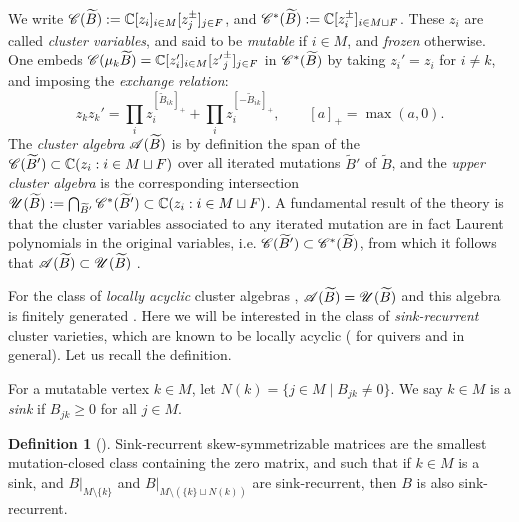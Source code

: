 \documentclass[12pt, letter]{amsart}
\theoremstyle{definition}
\newtheorem{definition}[dummy]{Definition}
\begin{document}
We write $\mathscr{C}(\widetilde B) := \mathbb{C}[z_i]_{i\in M} [z_j^{\pm}]_{j \in F}$, and $\mathscr{C}^*(\widetilde B) := \mathbb{C}[z_i^{\pm}]_{i\in M \sqcup F}$.  These $z_i$ are called {\em cluster variables}, and said to be {\em mutable} if $i\in M$, and {\em frozen} otherwise. 
One embeds $\mathscr{C}(\mu_k \widetilde B) = \mathbb{C}[z'_i]_{i\in M} [{z'}_j^{\pm}]_{j \in F}$ in  $\mathscr{C}^*(\widetilde B)$ by taking $z_i' = z_i$ for $i \ne k$, and imposing the {\em exchange relation}: 
\begin{equation}\label{eq:exchange}
 z_kz_k'=\prod_i z_i^{[\widetilde B_{ik}]_+}
              +\prod_i z_i^{[-\widetilde B_{ik}]_+},
 \qquad [a]_+=\max(a,0).
\end{equation}
The {\em cluster algebra}  $\mathscr{A}(\widetilde B)$ is by definition the span of the $\mathscr{C}(\widetilde B') \subset \mathbb{C}(z_i:i\in M\sqcup F)$ over all iterated mutations $\widetilde B'$ of $\widetilde B$, and the {\em upper cluster algebra} is the corresponding intersection 
$\mathscr{U}(\widetilde B) := \bigcap_{\widetilde B'} \mathscr{C}^*(\widetilde B') \subset \mathbb{C}(z_i:i\in M\sqcup F)$. 
A fundamental result of the theory is that  the cluster variables associated to any iterated mutation are in fact Laurent polynomials in the original variables, i.e.
$\mathscr{C}(\widetilde B') \subset \mathscr{C}^*(\widetilde B)$, from which it follows that $\mathscr{A}(\widetilde B) \subset \mathscr{U}(\widetilde B)$ \cite{FZ-I}.

For the class of {\em locally acyclic} cluster algebras \cite{M}, $\mathscr{A}(\widetilde B) = \mathscr{U}(\widetilde B)$ and this algebra is finitely generated \cite[Theorem~4.1 and 4.2]{M}.  Here we will be interested in the  class of {\em sink-recurrent} cluster varieties, which are known to be locally acyclic 
(\cite[Proposition~5.5]{GLSS} for quivers and  \cite[Proposition~3.7]{GLSB} in general).  Let us recall the definition. 


For a mutatable vertex \(k\in M\), let \(N(k) = \{j \in M \mid B_{jk} \neq 0 \}\).  We say \(k\in M\) is a \emph{sink} if \(B_{jk} \ge 0\) for all \(j\in M\). 

\begin{definition}[{\cite[Definition~5.4]{GLSS}}]
\label{def:sink-recurrence}
Sink-recurrent skew-symmetrizable
 matrices are the smallest mutation-closed class containing the zero matrix, and such that if $k \in M$ is a sink, and $B|_{M \setminus \{k\}}$ and $B|_{M \setminus (\{k\} \sqcup N(k))}$ are sink-recurrent, then $B$ is also sink-recurrent. 
\end{definition}
\end{document}
